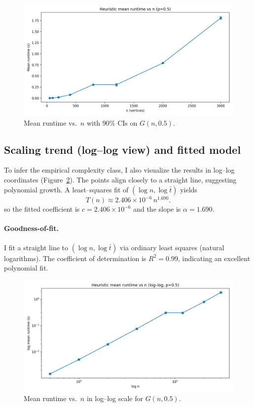 \documentclass[12pt]{article}
\begin{document}
\begin{figure}[H]
    \centering
    \includegraphics[width=0.95\linewidth]{images/heuristic_performance_normal.png}
    \caption{Mean runtime vs.\ \(n\) with \(90\%\) CIs on \(G(n,0.5)\).}
    \label{fig:mean-normal}
\end{figure}

\subsection{Scaling trend (log--log view) and fitted model}
To infer the empirical complexity class, I also visualize the results in log--log
coordinates (Figure~\ref{fig:mean-loglog}). The points align closely to a straight line,
suggesting polynomial growth. A least–squares fit of \((\log n,\log \bar t)\) yields
\[
T(n) \approx 2.406 \times 10^{-6}\, n^{1.690}.
\]
so the fitted coefficient is \(c = 2.406 \times 10^{-6}\) and the slope is \(\alpha = 1.690\).
\paragraph{Goodness-of-fit.}
I fit a straight line to $(\log n,\log \bar t)$ via ordinary least squares (natural logarithms). The coefficient of determination is $R^2=0.99$, indicating an excellent polynomial fit.
\begin{figure}[H]
    \centering
    \includegraphics[width=0.95\linewidth]{images/heuristic_performance_log.png}
    \caption{Mean runtime vs.\ \(n\) in log--log scale for \(G(n,0.5)\).}
    \label{fig:mean-loglog}
\end{figure}
\end{document}
